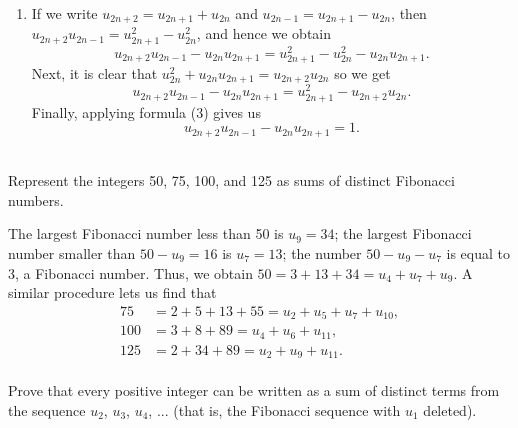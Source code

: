 \begin{solution}
\begin{enumerate}
        $$u_nu_{n+1}u_{n+3}u_{n+4} = (u_{n+2}^2 + (-1)^n)(u_{n+2}^2 - (-1)^n) = u_{n+2}^4 - 1.$$
        \item If we write $u_{2n+2} = u_{2n + 1} + u_{2n}$ and $u_{2n - 1} = u_{2n + 1} - u_{2n}$, then $u_{2n+2}u_{2n-1} = u_{2n+1}^2 - u_{2n}^2$, and hence we obtain
        $$u_{2n+2}u_{2n-1} - u_{2n}u_{2n+1} = u_{2n+1}^2 - u_{2n}^2 - u_{2n}u_{2n+1}.$$
        Next, it is clear that $u_{2n}^2 + u_{2n}u_{2n+1} = u_{2n+2}u_{2n}$ so we get 
        $$u_{2n+2}u_{2n-1} - u_{2n}u_{2n+1} = u_{2n+1}^2 - u_{2n+2}u_{2n}.$$
        Finally, applying formula (3) gives us
        $$u_{2n+2}u_{2n-1} - u_{2n}u_{2n+1} = 1.$$\\
    \end{enumerate}
\end{solution}

\begin{exercise}
    Represent the integers 50, 75, 100, and 125 as sums of distinct Fibonacci numbers. \\
\end{exercise}

\begin{solution}
    The largest Fibonacci number less than 50 is $u_9 = 34$; the largest Fibonacci number smaller than $50 - u_9 = 16$ is $u_7 = 13$; the number $50 - u_9 - u_7$ is equal to 3, a Fibonacci number. Thus, we obtain $50 = 3 + 13 + 34= u_4 + u_7 + u_9$. A similar procedure lets us find that
    \begin{align*}
        75 &= 2 + 5 + 13 + 55 = u_2 + u_5 + u_7 + u_{10}, \\
        100 &= 3 + 8 + 89 = u_4 + u_6 + u_{11}, \\
        125 &= 2 + 34 + 89 = u_2 + u_9 + u_{11}.\\
    \end{align*}
\end{solution}

\begin{exercise}
    Prove that every positive integer can be written as a sum of distinct terms from the sequence $u_2$, $u_3$, $u_4$, ... (that is, the Fibonacci sequence with $u_1$ deleted). \\
\end{exercise}

